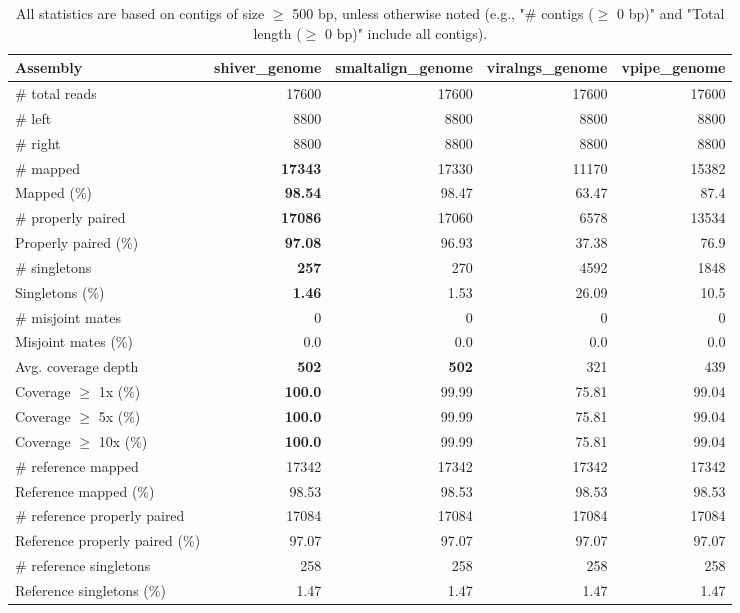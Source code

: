 \documentclass[12pt,a4paper]{article}
\begin{document}
\begin{table}[ht]
\begin{center}
\caption{All statistics are based on contigs of size $\geq$ 500 bp, unless otherwise noted (e.g., "\# contigs ($\geq$ 0 bp)" and "Total length ($\geq$ 0 bp)" include all contigs).}
\begin{tabular}{|l*{4}{|r}|}
\hline
Assembly & shiver\_genome & smaltalign\_genome & viralngs\_genome & vpipe\_genome \\ \hline
\# total reads & 17600 & 17600 & 17600 & 17600 \\ \hline
\# left & 8800 & 8800 & 8800 & 8800 \\ \hline
\# right & 8800 & 8800 & 8800 & 8800 \\ \hline
\# mapped & {\bf 17343} & 17330 & 11170 & 15382 \\ \hline
Mapped (\%) & {\bf 98.54} & 98.47 & 63.47 & 87.4 \\ \hline
\# properly paired & {\bf 17086} & 17060 & 6578 & 13534 \\ \hline
Properly paired (\%) & {\bf 97.08} & 96.93 & 37.38 & 76.9 \\ \hline
\# singletons & {\bf 257} & 270 & 4592 & 1848 \\ \hline
Singletons (\%) & {\bf 1.46} & 1.53 & 26.09 & 10.5 \\ \hline
\# misjoint mates & 0 & 0 & 0 & 0 \\ \hline
Misjoint mates (\%) & 0.0 & 0.0 & 0.0 & 0.0 \\ \hline
Avg. coverage depth & {\bf 502} & {\bf 502} & 321 & 439 \\ \hline
Coverage $\geq$ 1x (\%) & {\bf 100.0} & 99.99 & 75.81 & 99.04 \\ \hline
Coverage $\geq$ 5x (\%) & {\bf 100.0} & 99.99 & 75.81 & 99.04 \\ \hline
Coverage $\geq$ 10x (\%) & {\bf 100.0} & 99.99 & 75.81 & 99.04 \\ \hline
\# reference mapped & 17342 & 17342 & 17342 & 17342 \\ \hline
Reference mapped (\%) & 98.53 & 98.53 & 98.53 & 98.53 \\ \hline
\# reference properly paired & 17084 & 17084 & 17084 & 17084 \\ \hline
Reference properly paired (\%) & 97.07 & 97.07 & 97.07 & 97.07 \\ \hline
\# reference singletons & 258 & 258 & 258 & 258 \\ \hline
Reference singletons (\%) & 1.47 & 1.47 & 1.47 & 1.47 \\ \hline

\end{tabular}
\end{center}
\end{table}
\end{document}
